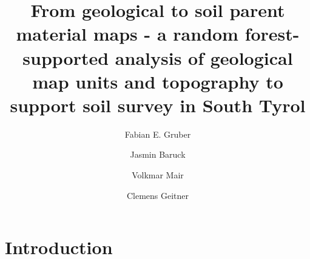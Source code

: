 \documentclass[preprint,12pt,authoryear]{elsarticle}
\begin{document}
\begin{frontmatter}

\title{From geological to soil parent material maps - a random forest-supported  analysis of geological map units and topography to support soil survey in South Tyrol}



\author[mymainadress]{Fabian E. Gruber}
\author[mymainadress]{Jasmin Baruck}
\author[secondadress]{Volkmar Mair}
\author[mymainadress]{Clemens Geitner}



\address[mymainadress]{Institute of Geography, University of Innsbruck, Innrain 52f, 6020 Innsbruck, Austria}
\address[secondadress]{ Amt f\"ur Geologie und Baustoffpr\"ufung, Eggentaler Straße 48, 39053 Kardaun, Autonomous Province Bolzano -- South Tyrol, Italy}
\begin{abstract}

\end{abstract}

\begin{keyword}

\end{keyword}

\end{frontmatter}

\linenumbers

\section{Introduction}
\end{document}
